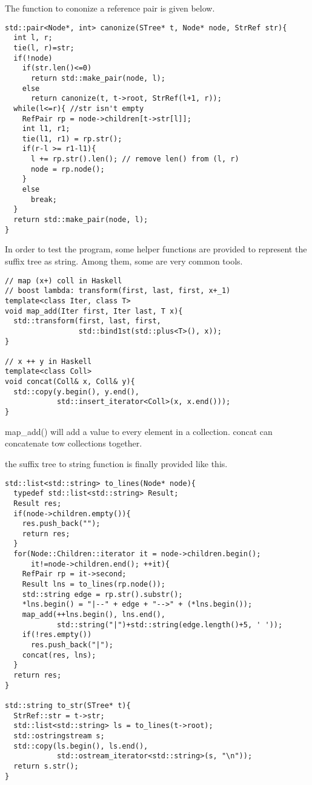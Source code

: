 \documentclass{article}
\begin{document}
The function to cononize a reference pair is given below.

\begin{lstlisting}
std::pair<Node*, int> canonize(STree* t, Node* node, StrRef str){
  int l, r;
  tie(l, r)=str;
  if(!node)
    if(str.len()<=0)
      return std::make_pair(node, l);
    else
      return canonize(t, t->root, StrRef(l+1, r));
  while(l<=r){ //str isn't empty
    RefPair rp = node->children[t->str[l]];
    int l1, r1;
    tie(l1, r1) = rp.str();
    if(r-l >= r1-l1){
      l += rp.str().len(); // remove len() from (l, r)
      node = rp.node();
    }
    else
      break;
  }
  return std::make_pair(node, l);
}
\end{lstlisting}

In order to test the program, some helper functions are provided
to represent the suffix tree as string. Among them, some are very
common tools.

\begin{lstlisting}
// map (x+) coll in Haskell
// boost lambda: transform(first, last, first, x+_1)
template<class Iter, class T>
void map_add(Iter first, Iter last, T x){
  std::transform(first, last, first, 
                 std::bind1st(std::plus<T>(), x));
}

// x ++ y in Haskell
template<class Coll>
void concat(Coll& x, Coll& y){
  std::copy(y.begin(), y.end(), 
            std::insert_iterator<Coll>(x, x.end()));
}
\end{lstlisting}

map\_add() will add a value to every element in a collection.
concat can concatenate tow collections together.

the suffix tree to string function is finally provided like this.

\begin{lstlisting}
std::list<std::string> to_lines(Node* node){
  typedef std::list<std::string> Result;
  Result res;
  if(node->children.empty()){
    res.push_back("");
    return res;
  }
  for(Node::Children::iterator it = node->children.begin();
      it!=node->children.end(); ++it){
    RefPair rp = it->second;
    Result lns = to_lines(rp.node());
    std::string edge = rp.str().substr();
    *lns.begin() = "|--" + edge + "-->" + (*lns.begin());
    map_add(++lns.begin(), lns.end(), 
            std::string("|")+std::string(edge.length()+5, ' '));
    if(!res.empty())
      res.push_back("|");
    concat(res, lns);
  }
  return res;
}

std::string to_str(STree* t){
  StrRef::str = t->str;
  std::list<std::string> ls = to_lines(t->root);
  std::ostringstream s;
  std::copy(ls.begin(), ls.end(), 
            std::ostream_iterator<std::string>(s, "\n"));
  return s.str();
}
\end{lstlisting}
\end{document}
